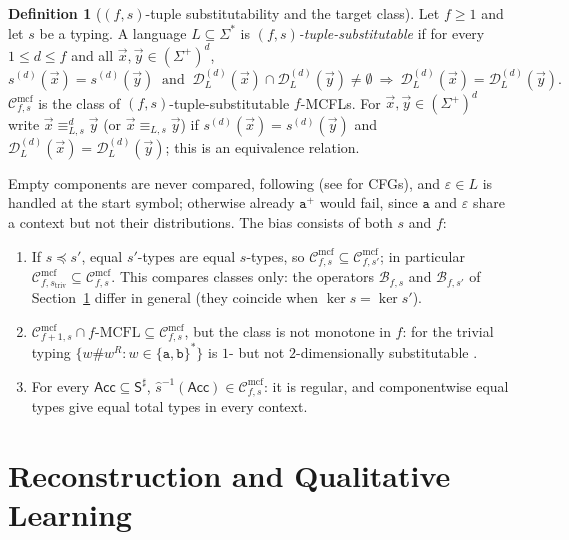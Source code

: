 \documentclass[11pt]{article}
\numberwithin{equation}{section}
\theoremstyle{plain}
\theoremstyle{definition}
\newtheorem{definition}[theorem]{Definition}
\theoremstyle{remark}
\newcommand{\Cmcf}[2]{\mathcal{C}^{\mathrm{mcf}}_{#1,#2}}
\newcommand{\D}{\mathcal{D}}
\newcommand{\tuple}[1]{\vec{#1}}
\newcommand{\eps}{\varepsilon}
\theoremstyle{plain}
\begin{document}
\begin{definition}[$(f,s)$-tuple substitutability and the target class]
\label{def:tuple-substitutable}
\label{def:class-cmcf}
Let $f\ge1$ and let $s$ be a typing.  A language $L\subseteq\Sigma^*$ is
\emph{$(f,s)$-tuple-substitutable} if for every $1\le d\le f$ and all
$\tuple x,\tuple y\in(\Sigma^+)^d$,
\[
 s^{(d)}(\tuple x)=s^{(d)}(\tuple y)\ \text{ and }\
 \D_L^{(d)}(\tuple x)\cap\D_L^{(d)}(\tuple y)\ne\emptyset
 \ \Longrightarrow\
 \D_L^{(d)}(\tuple x)=\D_L^{(d)}(\tuple y).
\]
$\Cmcf{f}{s}$ is the class of $(f,s)$-tuple-substitutable $f$-MCFLs.  For
$\tuple x,\tuple y\in(\Sigma^+)^d$ write $\tuple x\equiv_{L,s}^d\tuple y$ (or
$\tuple x\equiv_{L,s}\tuple y$) if $s^{(d)}(\tuple x)=s^{(d)}(\tuple y)$ and
$\D_L^{(d)}(\tuple x)=\D_L^{(d)}(\tuple y)$; this is an equivalence relation.
\end{definition}

Empty components are never compared, following
\cite[Section~3.1 and footnote~3]{Yoshinaka2011} (see \cite{Clark2013} for
CFGs), and $\eps\in L$ is handled at the start symbol; otherwise already
$\mathtt a^+$ would fail, since $\mathtt a$ and $\eps$ share a context but not
their distributions.  The bias consists of both $s$ and $f$:
\begin{enumerate}[label=\textup{(\alph*)},leftmargin=*]
\item If $s\preceq s'$, equal $s'$-types are equal $s$-types, so
$\Cmcf{f}{s}\subseteq\Cmcf{f}{s'}$; in particular
$\Cmcf{f}{s_{\mathrm{triv}}}\subseteq\Cmcf{f}{s}$.  This compares classes
only: the operators $\mathcal B_{f,s}$ and $\mathcal B_{f,s'}$ of
Section~\ref{sec:learner} differ in general (they coincide when
$\ker s=\ker s'$).
\item $\Cmcf{f+1}{s}\cap f\text{-}\mathrm{MCFL}\subseteq\Cmcf{f}{s}$, but the
class is not monotone in $f$: for the trivial typing
$\{w\mathtt{\#}w^R:w\in\{\mathtt a,\mathtt b\}^*\}$ is
$1$- but not $2$-dimensionally substitutable
\cite[Section~3.1, Example~5]{Yoshinaka2011}.
\item For every $\mathsf{Acc}\subseteq\mathsf S^\sharp$,
$\widehat{s}^{-1}(\mathsf{Acc})\in\Cmcf{f}{s}$: it is regular, and
componentwise equal types give equal total types in every context.
\end{enumerate}

\section{Reconstruction and Qualitative Learning}
\label{sec:learner}
\end{document}
